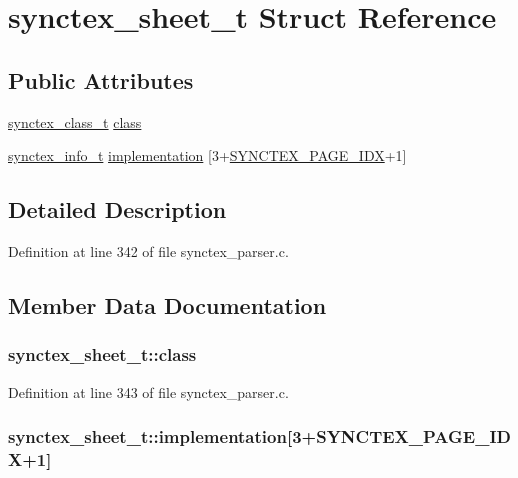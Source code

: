 \hypertarget{structsynctex__sheet__t}{\section{synctex\+\_\+sheet\+\_\+t Struct Reference}
\label{structsynctex__sheet__t}
}
\subsection*{Public Attributes}
\begin{DoxyCompactItemize}
\item 
\hyperlink{synctex__parser_8c_a68d11a2cb22716e7abd35cffed7d54c5}{synctex\+\_\+class\+\_\+t} \hyperlink{structsynctex__sheet__t_a7cf26c3b30e661f34bc647c62d7ed119}{class}
\item 
\hyperlink{synctex__parser_8c_a864f981cdab43a24765efb685074cf70}{synctex\+\_\+info\+\_\+t} \hyperlink{structsynctex__sheet__t_a2b675322796a6c1be7a06c2cef94e1c8}{implementation} \mbox{[}3+\hyperlink{synctex__parser_8c_aaa62ab03b0fddabea3e1b7dae53f1368}{S\+Y\+N\+C\+T\+E\+X\+\_\+\+P\+A\+G\+E\+\_\+\+I\+D\+X}+1\mbox{]}
\end{DoxyCompactItemize}


\subsection{Detailed Description}


Definition at line 342 of file synctex\+\_\+parser.\+c.



\subsection{Member Data Documentation}
\hypertarget{structsynctex__sheet__t_a7cf26c3b30e661f34bc647c62d7ed119}{
\subsubsection[{class}]{ synctex\+\_\+sheet\+\_\+t\+::class}}\label{structsynctex__sheet__t_a7cf26c3b30e661f34bc647c62d7ed119}


Definition at line 343 of file synctex\+\_\+parser.\+c.

\hypertarget{structsynctex__sheet__t_a2b675322796a6c1be7a06c2cef94e1c8}{
\subsubsection[{implementation}]{ synctex\+\_\+sheet\+\_\+t\+::implementation\mbox{[}3+{\bf S\+Y\+N\+C\+T\+E\+X\+\_\+\+P\+A\+G\+E\+\_\+\+I\+D\+X}+1\mbox{]}}}\label{structsynctex__sheet__t_a2b675322796a6c1be7a06c2cef94e1c8}



